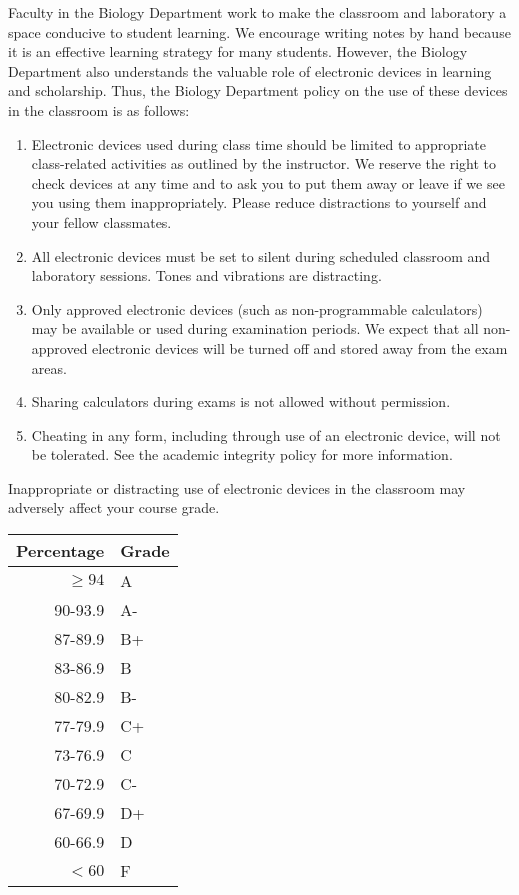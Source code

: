 \documentclass{tufte-handout}
\begin{document}
Faculty in the Biology Department work to make the classroom and laboratory a space conducive to student learning. We encourage writing notes by hand because it is an effective learning strategy for many students. However, the Biology Department also understands the valuable role of electronic devices in learning and scholarship. Thus, the Biology Department policy on the use of these devices in the classroom is as follows:


\begin{enumerate}
\item Electronic devices used during class time should be limited to appropriate class-related activities as outlined by the instructor. We reserve the right to check devices at any time and to ask you to put them away or leave if we see you using them inappropriately. Please reduce distractions to yourself and your fellow classmates.
\item All electronic devices must be set to silent during scheduled classroom and laboratory sessions. Tones and vibrations are distracting.
\item Only approved electronic devices (such as non-programmable calculators) may be available or used during examination periods. We expect that all non-approved electronic devices will be turned off and stored away from the exam areas.
\item Sharing calculators during exams is not allowed without permission. 
\item Cheating in any form, including through use of an electronic device, will not be tolerated. See the academic integrity policy for more information.
\end{enumerate}

Inappropriate or distracting use of electronic devices in the classroom may adversely affect your course grade. 


\begin{margintable}
\begin{tabular}{rl}
Percentage & Grade \\
\hline 
$\ge94$ & A \\
90-93.9 & A- \\
87-89.9 & B+ \\
83-86.9 & B \\
80-82.9 & B- \\
77-79.9 & C+ \\
73-76.9 & C \\
70-72.9 & C- \\
67-69.9 & D+ \\
60-66.9 & D \\
$<60$ & F \\
\hline
\end{tabular}
\end{margintable}
\end{document}
